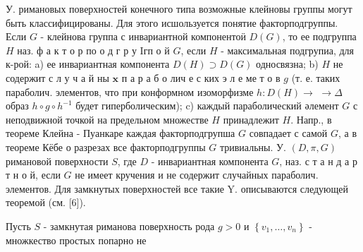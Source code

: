 \documentclass[10pt]{article}
\begin{document}
У. римановых поверхностей конечного типа возможные клейновы группы могут быть классифицированы. Для этого исшользуется понятие факторподгруппы. Если $G$ - клейнова группа с инвариантной компонентоӥ $D(G)$, то ее подгруппа $H$ наз. ф а к т о р по о д г р у Iгп о й $G$, если $H$ - максимальная подгрупиа, для к-рой: a) ее инвариантная компонента $D(H) \supset D(G)$ односвязна; b) $H$ не содержит с л у ч а й ны $\mathbf{x}$ п а р а б о лич е с ких э л е ме т о в $g$ (т. е. таких параболич. элементов, что при конформном изоморфизме $h: D(H) \rightarrow$ $\rightarrow \Delta$ образ $h \circ g \circ h^{-1}$ будет гиперболическим); c) каждый параболический әлемент $G$ с неподвижной точкой на предельном множестве $H$ принадлежит $H$. Напр., в теореме Клейна - Пуанкаре каждая факторподгрупша $G$ совпадает с самой $G$, а в теореме Кёбе о разрезах все факторподгруппы $G$ тривиальны. У. $(D, \pi, G)$ римановой поверхности $S$, где $D$ - инвариантная компонента $G$, наз. с т а н д а р т н о й, если $G$ не имеет кручения и не содержит случайных параболич. элементов. Для замкнутых поверхностей все такие $\mathrm{Y}$. описываются следующей теоремой (см. [6]).



Пусть $S$ - замкнутая риманова поверхность рода $g>0$ и $\left\{v_{1}, \ldots, v_{n}\right\}$ - множкество простых попарно не
\end{document}
